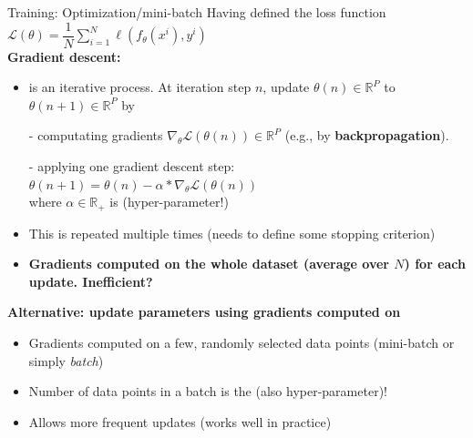 \begin{frame}{Training: Optimization/mini-batch}
Having defined the loss function $\displaystyle \mathcal{L(\theta)} = \dfrac{1}{N} \sum_{i=1}^N \ell\left(f_{\theta}(x^i), y^i\right)$\\
\vsp
\textbf{Gradient descent:}
\begin{itemize}
\item is an iterative process. At iteration step $n$, update $\theta(n) \in \mathbb{R}^P$ to $\theta(n+1) \in \mathbb{R}^P$ by
\item[-] computating gradients $\nabla_{\theta}\mathcal{L}(\theta(n)) \in \mathbb{R}^P$ (e.g., by \textbf{backpropagation}).
\item[-] applying one gradient descent step: $\theta(n+1) = \theta(n) - \alpha * \nabla_{\theta} \mathcal{L}(\theta(n))$\\
where $\alpha \in \mathbb{R}_{+}$ is  (hyper-parameter!)
\pause
\item This is repeated multiple times (needs to define some stopping criterion)
\pause
\item \textbf{Gradients computed on the whole dataset (average over $N$) for each update. Inefficient?}
\end{itemize}
\pause
\vsp
\textbf{Alternative: update parameters using gradients computed on} 
\begin{itemize}
\item Gradients computed on a few, randomly selected data points (mini-batch or simply \textit{batch})
\item Number of data points in a batch is the  (also hyper-parameter)!
\item Allows more frequent updates (works well in practice)
\end{itemize}
\end{frame}


